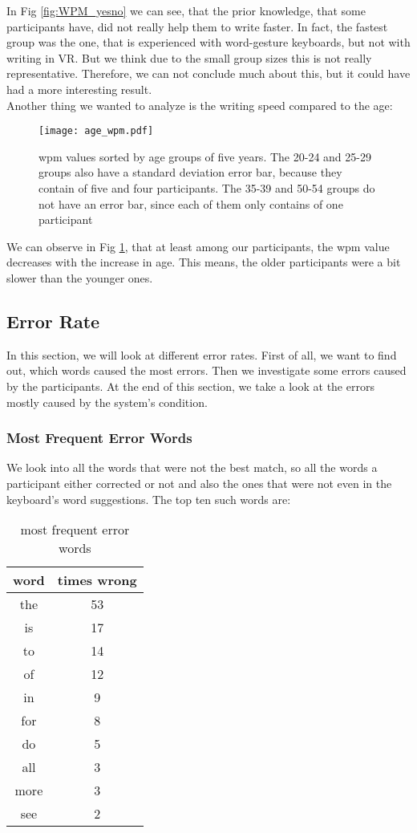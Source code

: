 In Fig \ref{fig:WPM_yesno} we can see, that the prior knowledge, that some participants have, did not really help them to write faster. In fact, the fastest group was the one, that is experienced with word-gesture keyboards, but not with writing in VR. But we think due to the small group sizes this is not really representative. Therefore, we can not conclude much about this, but it could have had a more interesting result.\\

Another thing we wanted to analyze is the writing speed compared to the age:
\begin{figure}[H]
    \centering
    \texttt{[image: age\_wpm.pdf]}
    \caption{wpm values sorted by age groups of five years. The 20-24 and 25-29 groups also have a standard deviation error bar, because they contain of five and four participants. The 35-39 and 50-54 groups do not have an error bar, since each of them only contains of one participant}
    \label{fig:WPM_age}
\end{figure}

We can observe in Fig \ref{fig:WPM_age}, that at least among our participants, the wpm value decreases with the increase in age. This means, the older participants were a bit slower than the younger ones. 

\subsection{Error Rate}
In this section, we will look at different error rates. First of all, we want to find out, which words caused the most errors. Then we investigate some errors caused by the participants. At the end of this section, we take a look at the errors mostly caused by the system's condition.

\subsubsection{Most Frequent Error Words}
We look into all the words that were not the best match, so all the words a participant either corrected or not and also the ones that were not even in the keyboard's word suggestions. The top ten such words are:
\begin{table}[H]
    \centering
    \caption{most frequent error words}
    \begin{tabular}{cc} \toprule
        word&times wrong\\ \midrule
        the & 53\\
        is & 17\\
        to & 14\\
        of & 12\\
        in & 9\\
        for & 8\\
        do & 5\\
        all & 3\\
        more & 3\\
        see & 2\\
        \bottomrule
    \end{tabular}
    \label{tab:error_words}
\end{table}

